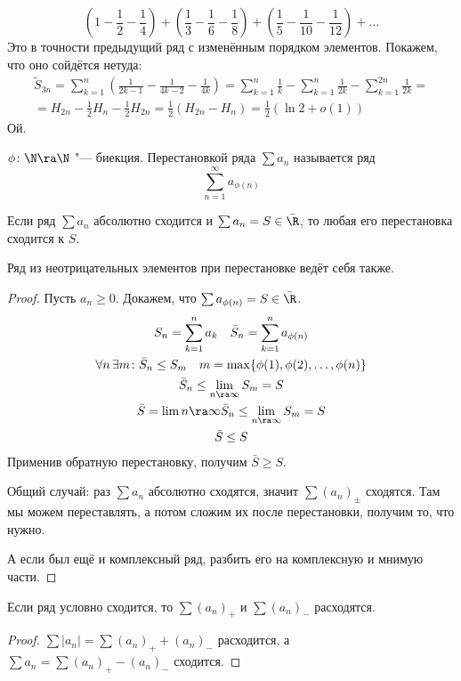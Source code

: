 \begin{exmp}
	\[ (1 - \frac12 - \frac14) + (\frac13 - \frac16 - \frac18) + (\frac15 - \frac1{10} - \frac1{12}) + \dots \]
	Это в точности предыдущий ряд с изменённым порядком элементов.
	Покажем, что оно сойдётся нетуда:
	\begin{gather*}
		\tilde S_{3n}
		= \sum_{k=1}^n \left(\frac1{2k-1} - \frac1{4k-2} - \frac1{4k}\right)
		= \sum_{k=1}^n \frac1k - \sum_{k=1}^n \frac1{2k} - \sum_{k=1}^{2n} \frac1{2k} = \\
		= H_{2n} - \frac12 H_n - \frac12 H_{2n} = \frac12 (H_{2n} - H_n) = \frac12 (\ln 2 + o(1))
	\end{gather*}
	Ой.
\end{exmp}

\begin{Def}
	$\phi\colon \N \ra \N$ "--- биекция.
	Перестановкой ряда $\sum a_n$ называется ряд
	\[ \sum_{n=1}^\infty a_{\phi(n)} \]
\end{Def}

\begin{theorem}
	Если ряд $\sum a_n$ абсолютно сходится и $\sum a_n = S \in \bar \R$, то любая его перестановка сходится к $S$.
\end{theorem}
\begin{Rem}
	Ряд из неотрицательных элементов при перестановке ведёт себя также.
\end{Rem}
\begin{proof}
	Пусть $a_n \ge 0$.
	Докажем, что $\sum a_{\phi(n)} = S \in \bar \R$.
	\begin{gather*}
		S_n = \sum_{k=1}^n a_k \quad \bar S_n = \sum_{k=1}^n a_{\phi(n)} \\
		\forall n\, \exists m\colon \bar S_n \le S_m \quad m = \max\{\phi(1), \phi(2), \dots, \phi(n)\} \\
		\bar S_n \le \lim_{n\ra\infty} S_m = S \\
		\bar S = \lim{n\ra\infty} \bar S_n \le \lim_{n\ra\infty} S_m = S \\
		\bar S \le S
	\end{gather*}
	Применив обратную перестановку, получим $\bar S \ge S$.

	Общий случай: раз $\sum a_n$ абсолютно сходятся, значит $\sum (a_n)_\pm$ сходятся.
	Там мы можем переставлять, а потом сложим их после перестановки, получим то, что нужно.

	А если был ещё и комплексный ряд, разбить его на комплексную и мнимую части.
\end{proof}

\begin{Rem}
	Если ряд условно сходится, то $\sum (a_n)_+$ и $\sum (a_n)_-$ расходятся.
\end{Rem}
\begin{proof}
	$\sum |a_n| = \sum (a_n)_+ + (a_n)_-$ расходится, а $\sum a_n = \sum (a_n)_+ - (a_n)_-$ сходится.
\end{proof}
